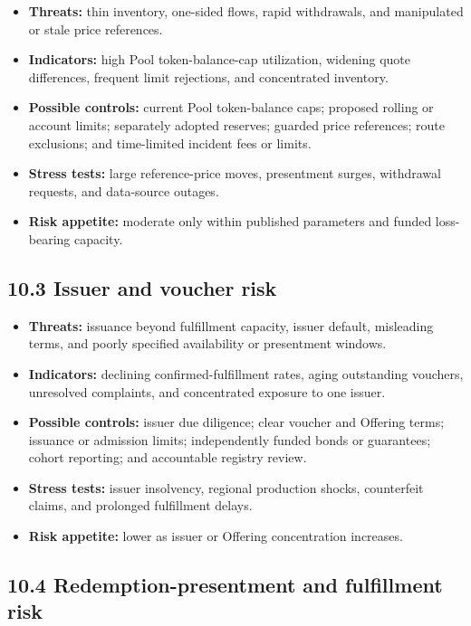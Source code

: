 \documentclass[11pt]{article}
\begin{document}
\begin{itemize}[leftmargin=*]
\item \textbf{Threats:} thin inventory, one-sided flows, rapid withdrawals, and manipulated or stale price references.
\item \textbf{Indicators:} high Pool token-balance-cap utilization, widening quote differences, frequent limit rejections, and concentrated inventory.
\item \textbf{Possible controls:} current Pool token-balance caps; proposed rolling or account limits; separately adopted reserves; guarded price references; route exclusions; and time-limited incident fees or limits.
\item \textbf{Stress tests:} large reference-price moves, presentment surges, withdrawal requests, and data-source outages.
\item \textbf{Risk appetite:} moderate only within published parameters and funded loss-bearing capacity.
\end{itemize}
\subsection*{10.3 Issuer and voucher risk}

\begin{itemize}[leftmargin=*]
\item \textbf{Threats:} issuance beyond fulfillment capacity, issuer default, misleading terms, and poorly specified availability or presentment windows.
\item \textbf{Indicators:} declining confirmed-fulfillment rates, aging outstanding vouchers, unresolved complaints, and concentrated exposure to one issuer.
\item \textbf{Possible controls:} issuer due diligence; clear voucher and Offering terms; issuance or admission limits; independently funded bonds or guarantees; cohort reporting; and accountable registry review.
\item \textbf{Stress tests:} issuer insolvency, regional production shocks, counterfeit claims, and prolonged fulfillment delays.
\item \textbf{Risk appetite:} lower as issuer or Offering concentration increases.
\end{itemize}
\subsection*{10.4 Redemption-presentment and fulfillment risk}
\end{document}
